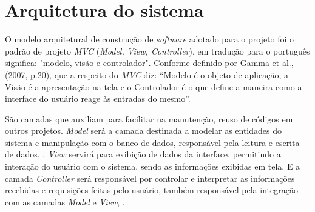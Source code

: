 \documentclass[
	12pt,				%
	openright,			%
	oneside,			%
	a4paper,			%
	english,			%
	french,				%
	spanish,			%
	brazil,				%
	]{abntex2}
\begin{document}
\section{Arquitetura do sistema}

O modelo arquitetural de construção de \textit{software} adotado para o projeto foi o padrão de projeto \textit{MVC} (\textit{Model, View, Controller}), em tradução para o português significa: "modelo, visão e controlador". Conforme definido por Gamma et al., (2007, p.20), que a respeito do \textit{MVC} diz:  “Modelo é o objeto de aplicação, a Visão é a apresentação na tela e o Controlador é o que define a maneira como a interface do usuário reage às entradas do mesmo”.

São camadas que auxiliam para facilitar na manutenção, reuso de códigos em outros projetos. \textit{Model} será a camada destinada a modelar as entidades do sistema e manipulação com o banco de dados, responsável pela leitura e escrita de dados, \cite{Gamma2007}. \textit{View} servirá para exibição de dados da interface, permitindo a interação do usuário com o sistema, sendo as informações exibidas em tela. E a camada \textit{Controller} será responsável por controlar e interpretar as informações recebidas e requisições feitas pelo usuário, também responsável pela integração com as camadas \textit{Model} e \textit{View}, \cite{Wazlawick2013}.
\end{document}
